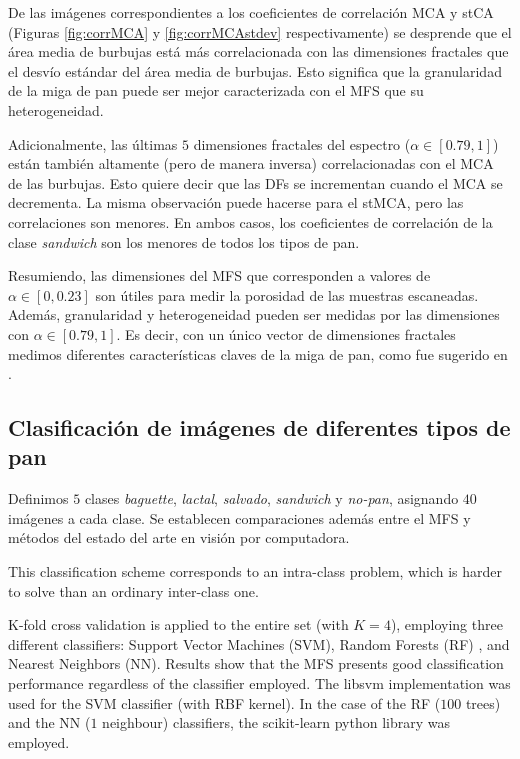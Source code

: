 De las imágenes correspondientes a los coeficientes de correlación MCA y stCA (Figuras \ref{fig:corrMCA} y \ref{fig:corrMCAstdev} respectivamente) se desprende que el área media de burbujas está más correlacionada con las dimensiones fractales que el desvío estándar del área media de burbujas. Esto significa que la granularidad de la miga de pan puede ser mejor caracterizada con el MFS que su heterogeneidad.

Adicionalmente, las últimas $5$ dimensiones fractales  del espectro ($\alpha \in [0.79,1]$) están también altamente (pero de manera inversa) correlacionadas con el MCA de las burbujas. Esto quiere decir que las DFs se incrementan cuando el MCA se decrementa. La misma observación puede hacerse para el stMCA, pero las correlaciones son menores. En ambos casos, los coeficientes de correlación de la clase {\em sandwich} son los menores de todos los tipos de pan.

Resumiendo, las dimensiones del MFS que corresponden a valores de  $\alpha \in [0,0.23]$ son útiles para medir la porosidad de las muestras escaneadas. Además, granularidad y heterogeneidad pueden ser medidas por las dimensiones con  $\alpha \in [0.79,1]$. Es decir, con un único vector de dimensiones fractales medimos diferentes características claves de la miga de pan, como fue sugerido en \cite{Gonzales2008}.

\subsection{Clasificaci\'on de imágenes de diferentes tipos de pan}

Definimos $5$ clases {\em baguette}, {\em lactal}, {\em salvado}, {\em sandwich} y {\em no-pan}, asignando $40$ imágenes a cada clase.  Se establecen comparaciones además entre el MFS y métodos del estado del arte en visión por computadora.

This classification scheme corresponds to an intra-class problem, which is harder to solve than an ordinary inter-class one. 

K-fold cross validation is applied to the entire set (with $K=4$), employing three different classifiers: Support Vector Machines (SVM), Random Forests (RF) \cite{Breiman2001}, and Nearest Neighbors (NN). Results show that the MFS presents good classification performance regardless of the classifier employed. The \textsf{libsvm} implementation \cite{Chang2011} was used for the SVM classifier (with RBF kernel). In the case of the RF ($100$ trees) and the NN ($1$ neighbour) classifiers, the \textsf{scikit-learn} python library was employed.

